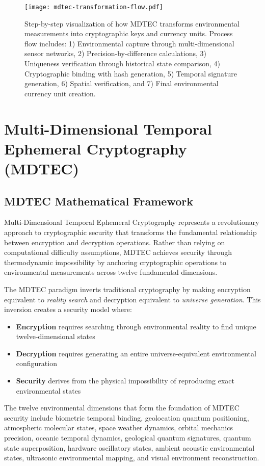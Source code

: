\documentclass[12pt,a4paper]{article}
\begin{document}
\begin{figure}[H]
\centering
\texttt{[image: mdtec-transformation-flow.pdf]}
\caption{Step-by-step visualization of how MDTEC transforms environmental measurements into cryptographic keys and currency units. Process flow includes: 1) Environmental capture through multi-dimensional sensor networks, 2) Precision-by-difference calculations, 3) Uniqueness verification through historical state comparison, 4) Cryptographic binding with hash generation, 5) Temporal signature generation, 6) Spatial verification, and 7) Final environmental currency unit creation.}
\label{fig:mdtec_transformation}
\end{figure}

\section{Multi-Dimensional Temporal Ephemeral Cryptography (MDTEC)}

\subsection{MDTEC Mathematical Framework}

Multi-Dimensional Temporal Ephemeral Cryptography represents a revolutionary approach to cryptographic security that transforms the fundamental relationship between encryption and decryption operations. Rather than relying on computational difficulty assumptions, MDTEC achieves security through thermodynamic impossibility by anchoring cryptographic operations to environmental measurements across twelve fundamental dimensions.

The MDTEC paradigm inverts traditional cryptography by making encryption equivalent to \textit{reality search} and decryption equivalent to \textit{universe generation}. This inversion creates a security model where:
\begin{itemize}
\item \textbf{Encryption} requires searching through environmental reality to find unique twelve-dimensional states
\item \textbf{Decryption} requires generating an entire universe-equivalent environmental configuration
\item \textbf{Security} derives from the physical impossibility of reproducing exact environmental states
\end{itemize}

The twelve environmental dimensions that form the foundation of MDTEC security include biometric temporal binding, geolocation quantum positioning, atmospheric molecular states, space weather dynamics, orbital mechanics precision, oceanic temporal dynamics, geological quantum signatures, quantum state superposition, hardware oscillatory states, ambient acoustic environmental states, ultrasonic environmental mapping, and visual environment reconstruction.
\end{document}
